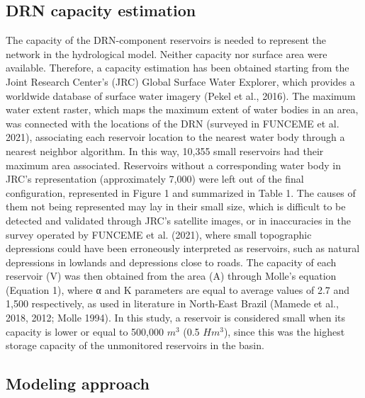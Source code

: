 \documentclass[draft]{agujournal2019}
\begin{document}
\subsection{DRN capacity estimation}
The capacity of the DRN-component reservoirs is needed to represent the network in the hydrological model.  Neither capacity nor surface area were available. Therefore, a capacity estimation has been obtained starting from the Joint Research Center’s (JRC) Global Surface Water Explorer, which provides a worldwide database of surface water imagery (Pekel et al., 2016). The maximum water extent raster, which maps the maximum extent of water bodies in an area, was connected with the locations of the DRN (surveyed in FUNCEME et al. 2021), associating each reservoir location to the nearest water body through a nearest neighbor algorithm. In this way, 10,355 small reservoirs had their maximum area associated. Reservoirs without a corresponding water body in JRC’s representation (approximately 7,000) were left out of the final configuration, represented in Figure 1 and summarized in Table 1. The causes of them not being represented may lay in their small size, which is difficult to be detected and validated through JRC’s satellite images, or in inaccuracies in the survey operated by FUNCEME et al. (2021), where small topographic depressions could have been erroneously interpreted as reservoirs, such as natural depressions in lowlands and depressions close to roads. The capacity of each reservoir (V) was then obtained from the area (A) through Molle’s equation (Equation 1), where α and K parameters are equal to average values of 2.7 and 1,500 respectively, as used in literature in North-East Brazil (Mamede et al., 2018, 2012; Molle 1994). In this study, a reservoir is considered small when its capacity is lower or equal to 500,000 $m^3$ (0.5 $Hm^3$), since this was the highest storage capacity of the unmonitored reservoirs in the basin.

\subsection{Modeling approach}
\end{document}
